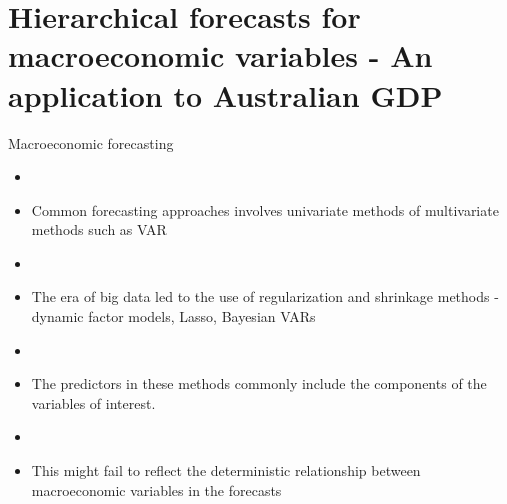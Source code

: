 \documentclass[11pt,xcolor=dvipsnames,handout]{beamer} %
\begin{document}





\section{Hierarchical forecasts for macroeconomic variables - An application to Australian GDP}



\begin{frame}[noframenumbering]{Macroeconomic forecasting}
\begin{itemize}[<+-| alert@+>]
	\item[] 
	\begin{figure}
		\begin{overprint}
			
		\end{overprint}
	\end{figure}
	\item Common forecasting approaches involves univariate methods of multivariate methods such as VAR
	\item[]
	\item The era of big data led to the use of regularization and shrinkage methods - dynamic factor models, Lasso, Bayesian VARs
	\item[]
	\item The predictors in these methods commonly include the components of the variables of interest. 
	\item[]
	\item This might fail to reflect the deterministic relationship between macroeconomic variables in the forecasts
	\end{itemize}
\end{frame}
\end{document}
